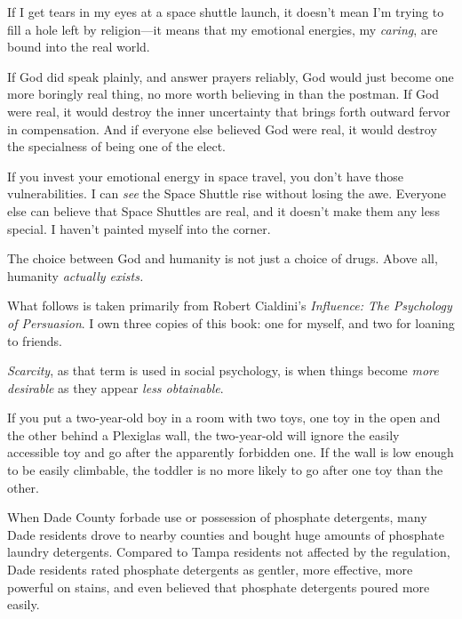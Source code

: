 {
 If I get tears in my eyes at a space shuttle launch, it
doesn't mean I'm trying to fill a hole
left by religion---it means that my emotional energies, my
\textit{caring}, are bound into the real world.}

{
 If God did speak plainly, and answer prayers reliably, God would
just become one more boringly real thing, no more worth believing in
than the postman. If God were real, it would destroy the inner
uncertainty that brings forth outward fervor in compensation. And if
everyone else believed God were real, it would destroy the specialness
of being one of the elect.}

{
 If you invest your emotional energy in space travel, you
don't have those vulnerabilities. I can \textit{see}
the Space Shuttle rise without losing the awe. Everyone else can
believe that Space Shuttles are real, and it doesn't
make them any less special. I haven't painted myself
into the corner.}

{
 The choice between God and humanity is not just a choice of drugs.
Above all, humanity \textit{actually exists.}}

\myendsectiontext


{
 What follows is taken primarily from Robert
Cialdini's \textit{Influence: The Psychology of
Persuasion}. I own three copies of this book: one
for myself, and two for loaning to friends. }

{
 \textit{Scarcity}, as that term is used in social psychology, is
when things become \textit{more desirable} as they appear \textit{less
obtainable}.}

{
 If you put a two-year-old boy in a room with two toys, one toy in
the open and the other behind a Plexiglas wall, the two-year-old will
ignore the easily accessible toy and go after the apparently forbidden
one. If the wall is low enough to be easily climbable, the toddler is
no more likely to go after one toy than the other.}

{
 When Dade County forbade use or possession of phosphate
detergents, many Dade residents drove to nearby counties and bought
huge amounts of phosphate laundry detergents. Compared to Tampa
residents not affected by the regulation, Dade residents rated
phosphate detergents as gentler, more effective, more powerful on
stains, and even believed that phosphate detergents poured more
easily.}

